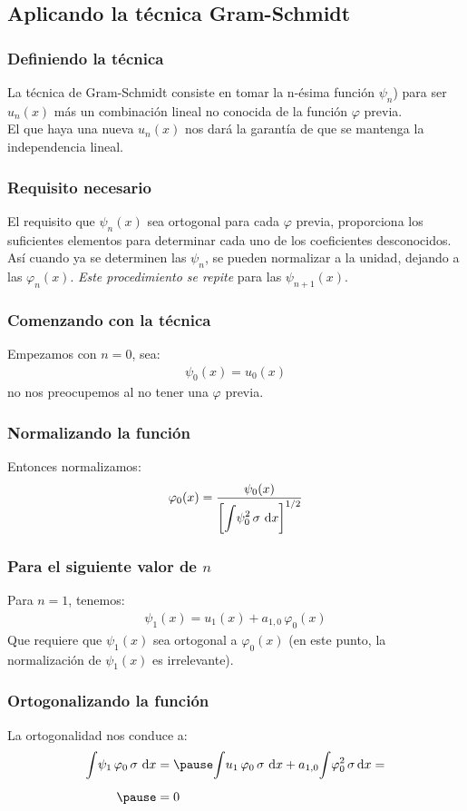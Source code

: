 \documentclass[12pt]{beamer}
\begin{document}
\subsection{Aplicando la técnica Gram-Schmidt}

\begin{frame}
\frametitle{Definiendo la técnica}
La técnica de Gram-Schmidt consiste en tomar la n-ésima función $\psi_{n}$) para ser $u_{n}(x)$ más un combinación lineal no conocida de la función $\varphi$ previa.
\\
\bigskip
\pause
El que haya una nueva $u_{n}(x)$ nos dará la garantía de que se mantenga la independencia lineal.
\end{frame}
\begin{frame}
\frametitle{Requisito necesario}
El requisito que $\psi_{n}(x)$ sea ortogonal para cada $\varphi$ previa, proporciona los suficientes elementos para determinar cada uno de los coeficientes desconocidos.
\\
\bigskip
\pause
Así cuando ya se determinen las $\psi_{n}$, se pueden normalizar a la unidad, dejando a las  $\varphi_{n} (x)$. \pause \emph{Este procedimiento se repite} para las $\psi_{n+1}(x)$.
\end{frame}
\begin{frame}
\frametitle{Comenzando con la técnica}
Empezamos con $n = 0$, sea:
\pause
\begin{align}
\psi_{0} (x) = u_{0} (x)
\label{eq:ecuacion_10_41}
\end{align}
\pause
no nos preocupemos al no tener una $\varphi$ previa.
\end{frame}
\begin{frame}
\frametitle{Normalizando la función}
Entonces normalizamos:
\pause
\begin{align}
\varphi_{0}(x) = \dfrac{\psi_{0} (x)}{\left[ \displaystyle \scaleint{5ex} \psi_{0}^{2} \, \sigma \, \dd{x} \right]^{1/2}}
\label{eq:ecuacion_10_42}
\end{align}
\end{frame}
\begin{frame}
\frametitle{Para el siguiente valor de $n$}
Para $n = 1$, tenemos:
\pause
\begin{align}
\psi_{1} (x) = u_{1} (x) + a_{1, 0} \, \varphi_{0} (x)
\label{eq:ecuacion_10_43}
\end{align}
\pause
Que requiere que $\psi_{1} (x)$ sea ortogonal a $\varphi_{0} (x)$ (en este punto, la normalización de $\psi_{1} (x)$ es irrelevante).
\end{frame}
\begin{frame}
\frametitle{Ortogonalizando la función}
La ortogonalidad nos conduce a:
\pause
\begin{eqnarray}
\begin{aligned}[b]
\scaleint{5ex} \psi_{1} \, \varphi_{0} \, \sigma \, \dd{x} &= \pause \scaleint{5ex} u_{1} \, \varphi_{0} \, \sigma \, \dd{x} + a_{1,0} \scaleint{5ex} \varphi_{0}^{2} \, \sigma \dd{x} = \\[0.5em] \pause
&= 0
\end{aligned}
\label{eq:ecuacion_10_44}
\end{eqnarray}
\end{frame}
\end{document}
